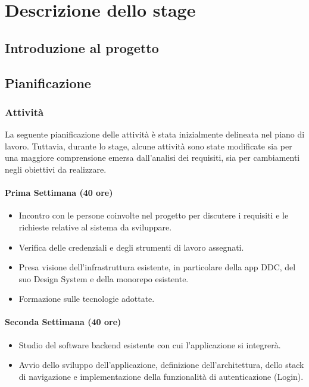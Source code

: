 \chapter{Descrizione dello stage}
\label{chap:stage_descrizione}

\section{Introduzione al progetto}

\section{Pianificazione}
\subsection{Attività}
La seguente pianificazione delle attività è stata inizialmente delineata nel piano di lavoro. 
Tuttavia, durante lo stage, alcune attività sono state modificate sia per una maggiore comprensione emersa dall'analisi dei requisiti, sia per cambiamenti negli obiettivi da realizzare.
\subsubsection*{Prima Settimana (40 ore)}
\begin{itemize}
    \item Incontro con le persone coinvolte nel progetto per discutere i requisiti e le richieste relative al sistema da sviluppare.
    \item Verifica delle credenziali e degli strumenti di lavoro assegnati.
    \item Presa visione dell'infrastruttura esistente, in particolare della app DDC, del suo Design System e della monorepo esistente.
    \item Formazione sulle tecnologie adottate.
\end{itemize}

\subsubsection*{Seconda Settimana (40 ore)}
\begin{itemize}
    \item Studio del software backend esistente con cui l'applicazione si integrerà.
    \item Avvio dello sviluppo dell'applicazione, definizione dell'architettura, dello stack di navigazione e implementazione della funzionalità di autenticazione (Login).
\end{itemize}

